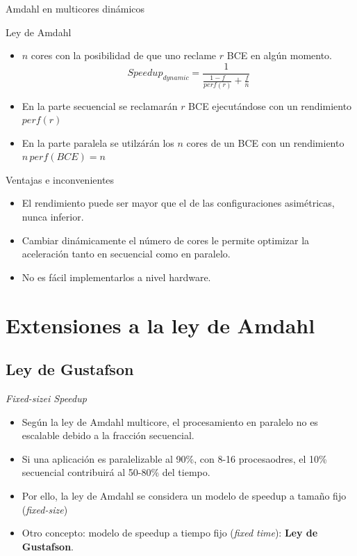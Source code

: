\documentclass[utf8]{beamer}
\begin{document}
\begin{frame}[allowframebreaks]{Amdahl en multicores dinámicos}
    \begin{block}{Ley de Amdahl}
        \begin{itemize}
            \item $n$ cores con la posibilidad de que uno reclame $r$ BCE en algún momento.
            $$ Speedup_{dynamic} = \frac{1}{\frac{1 - f}{perf(r)} + \frac{f}{n}} $$
            \item En la parte secuencial se reclamarán $r$ BCE ejecutándose con un rendimiento $perf(r)$
            \item En la parte paralela se utilzárán los $n$ cores de un BCE con un rendimiento $n\,perf(BCE) = n$
        \end{itemize}
    \end{block}
    \begin{block}{Ventajas e inconvenientes}
        \begin{itemize}
            \item El rendimiento puede ser mayor que el de las configuraciones asimétricas, nunca inferior.
            \item Cambiar dinámicamente el número de cores le permite optimizar la aceleración tanto en secuencial como en paralelo. 
            \item No es fácil implementarlos a nivel hardware.
        \end{itemize}
    \end{block}
\end{frame}

\section{Extensiones a la ley de Amdahl}

\subsection*{Ley de Gustafson}

\begin{frame}{\emph{Fixed-sizei Speedup}}
    \begin{block}{}
    \begin{itemize}
        \item Según la ley de Amdahl multicore, el procesamiento en paralelo no es escalable debido a la fracción secuencial.
        \item Si una aplicación es paralelizable al 90\%, con 8-16 procesaodres, el 10\% secuencial contribuirá al 50-80\% del tiempo.
        \item Por ello, la ley de Amdahl se considera un modelo de speedup a tamaño fijo (\emph{fixed-size})
        \item Otro concepto: modelo de speedup a tiempo fijo (\emph{fixed time}): \textbf{Ley de Gustafson}.
    \end{itemize}
    \end{block}
\end{frame}
\end{document}
